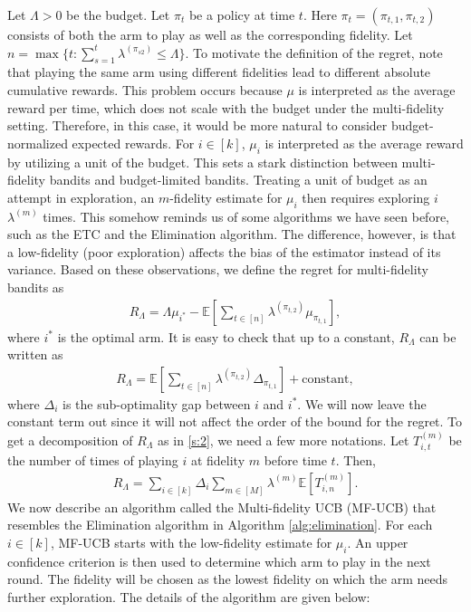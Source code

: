 \documentclass[letterpaper,10pt,openright,openany]{book}
\numberwithin{equation}{section}
\theoremstyle{plain}
\theoremstyle{definition}
\def\E{{\mathbb E}}
\begin{document}
Let $\Lambda>0$ be the budget. Let $\pi_t$ be a policy at time $t$. Here $\pi_t=(\pi_{t,1}, \pi_{t,2})$ consists of both the arm to play as well as the corresponding fidelity. Let $n=\max\{t:\sum_{s=1}^t\lambda^{(\pi_{s2})}\leq\Lambda\}$. To motivate the definition of the regret, note that playing the same arm using different fidelities lead to different absolute cumulative rewards.
This problem occurs because $\mu$ is interpreted as the average reward per time, which does not scale with the budget under the multi-fidelity setting. 
Therefore, in this case, it would be more natural to consider budget-normalized expected rewards. 
For $i\in [k]$, $\mu_i$ is interpreted as the average reward by utilizing a unit of the budget. 
This sets a stark distinction between multi-fidelity bandits and budget-limited bandits. 
Treating a unit of budget as an attempt in exploration, an $m$-fidelity estimate for $\mu_i$ then requires exploring $i$ $\lambda^{(m)}$ times.  
This somehow reminds us of some algorithms we have seen before, such as the ETC and the Elimination algorithm. 
The difference, however, is that a low-fidelity (poor exploration) affects the bias of the estimator instead of its variance. 
Based on these observations, we define the regret for multi-fidelity bandits as 
\begin{align*}
R_\Lambda=\Lambda\mu_{i^*}-\E\left[\sum_{t\in [n]}\lambda^{(\pi_{t,2})}\mu_{\pi_{t,1}}\right],
\end{align*}
where $i^*$ is the optimal arm. It is easy to check that up to a constant, $R_\Lambda$ can be written as 
\begin{align*}
R_\Lambda = \E\left[\sum_{t\in [n]}\lambda^{(\pi_{t,2})}\Delta_{\pi_{t,1}}\right] + \text{constant},
\end{align*}
where $\Delta_i$ is the sub-optimality gap between $i$ and $i^*$. We will now leave the constant term out since it will not affect the order of the bound for the regret. To get a decomposition of $R_\Lambda$ as in \eqref{s:2}, we need a few more notations. Let $T_{i,t}^{(m)}$ be the number of times of playing $i$ at fidelity $m$ before time $t$.  Then, 
\begin{align*}
R_\Lambda = \sum_{i\in [k]}\Delta_i\sum_{m\in [M]}\lambda^{(m)}\E\left[T_{i,n}^{(m)}\right]. 
\end{align*}
We now describe an algorithm called the Multi-fidelity UCB (MF-UCB) that resembles the Elimination algorithm in Algorithm \ref{alg:elimination}. For each $i\in [k]$, MF-UCB starts with the low-fidelity estimate for $\mu_i$. An upper confidence criterion is then used to determine which arm to play in the next round. The fidelity will be chosen as the lowest fidelity on which the arm needs further exploration. The details of the algorithm are given below:
\end{document}
